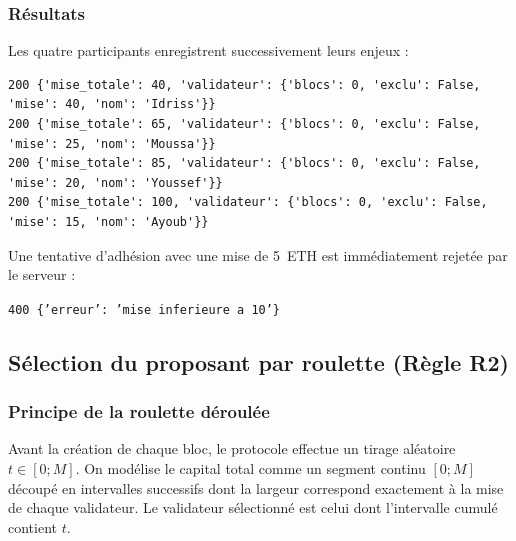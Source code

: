 \documentclass[11pt,a4paper]{article}
\begin{document}
\subsubsection*{Résultats}
Les quatre participants enregistrent successivement leurs enjeux :
\begin{lstlisting}
200 {'mise_totale': 40, 'validateur': {'blocs': 0, 'exclu': False, 'mise': 40, 'nom': 'Idriss'}}
200 {'mise_totale': 65, 'validateur': {'blocs': 0, 'exclu': False, 'mise': 25, 'nom': 'Moussa'}}
200 {'mise_totale': 85, 'validateur': {'blocs': 0, 'exclu': False, 'mise': 20, 'nom': 'Youssef'}}
200 {'mise_totale': 100, 'validateur': {'blocs': 0, 'exclu': False, 'mise': 15, 'nom': 'Ayoub'}}
\end{lstlisting}
Une tentative d'adhésion avec une mise de 5~ETH est immédiatement rejetée par le serveur :
\begin{center}
\texttt{400 \{'erreur': 'mise inferieure a 10'\}}
\end{center}

\subsection{Sélection du proposant par roulette (Règle R2)}

\subsubsection*{Principe de la roulette déroulée}
Avant la création de chaque bloc, le protocole effectue un tirage aléatoire $t \in [0 ; M]$. On modélise le capital total comme un segment continu $[0 ; M]$ découpé en intervalles successifs dont la largeur correspond exactement à la mise de chaque validateur. Le validateur sélectionné est celui dont l'intervalle cumulé contient $t$.
\end{document}
